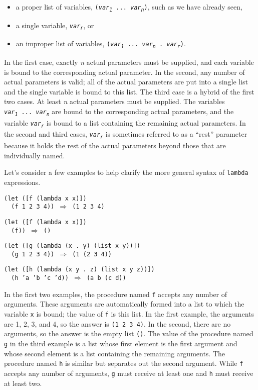 \begin{itemize}
\item 
a proper list of variables, \texttt{(\textit{var\textsubscript{1}} ... \textit{var\textsubscript{n}})}, such
as we have already seen,

\item 
a single variable, \texttt{\textit{var\textsubscript{r}}}, or

\item 
an improper list of variables,
\texttt{(\textit{var\textsubscript{1}} ... \textit{var\textsubscript{n}} . \textit{var\textsubscript{r}})}.

\end{itemize}


In the first case, exactly \textit{n} actual parameters must
be supplied, and
each variable is bound to the corresponding actual parameter.
In the second, any number of actual parameters is valid; all of the
actual parameters
are put into a single list and the single variable is bound to this
list.
The third case is a hybrid of the first two cases.
At least \textit{n} actual parameters must be supplied.
The variables \texttt{\textit{var\textsubscript{1}} ... \textit{var\textsubscript{n}}}
are bound to the corresponding actual parameters,
and the variable \texttt{\textit{var\textsubscript{r}}} is bound to a list containing
the remaining actual parameters.
In the second and third cases, \texttt{\textit{var\textsubscript{r}}} is sometimes referred to
as a ``rest'' parameter because it holds the rest of the actual
parameters beyond those that are individually named.


Let's consider a few examples to help clarify the more general
syntax of \texttt{lambda} expressions.


\begin{alltt}
(let ([f (lambda x x)])
  (f 1 2 3 4)) \(\Rightarrow\) (1 2 3 4)

(let ([f (lambda x x)])
  (f)) \(\Rightarrow\) ()

(let ([g (lambda (x . y) (list x y))])
  (g 1 2 3 4)) \(\Rightarrow\) (1 (2 3 4))

(let ([h (lambda (x y . z) (list x y z))])
  (h 'a 'b 'c 'd)) \(\Rightarrow\) (a b (c d))
\end{alltt}


In the first two examples, the procedure named \texttt{f} accepts any
number of arguments.
These arguments are automatically formed into a list to which the
variable \texttt{x} is bound; the value of \texttt{f} is this list.
In the first example, the arguments are 1, 2, 3,
and 4, so the answer is \texttt{(1 2 3 4)}.
In the second, there are no arguments, so the answer is the empty
list \texttt{()}.
The value of the procedure named \texttt{g} in the third example
is a list whose first element is the first argument and whose
second element is a list containing the remaining arguments.
The procedure named \texttt{h} is similar but separates out the
second argument.
While \texttt{f} accepts any number of arguments, \texttt{g} must receive
at least one and \texttt{h} must receive at least two.


